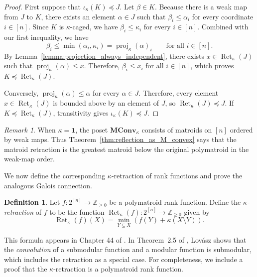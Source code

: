 \documentclass[11pt]{article}
\theoremstyle{definition}
\newtheorem{definition}[theorem]{Definition}
\theoremstyle{remark}
\newtheorem{remark}[theorem]{Remark}
\newcommand{\Zgeq}{\mathbb{Z}_{\geq 0}}       %
\newcommand{\ones}{\textbf{1}}
\newcommand{\MConvK}{\mathbf{MConv}_\kappa}
\DeclareMathOperator{\proj}{proj}              %
\newcommand{\kproj}{\proj_{\kappa}}            %
\DeclareMathOperator{\Ret}{Ret}                %
\newcommand{\RetK}{\Ret_{\kappa}}              %
\begin{document}
\begin{proof}
    First suppose that $\iota_\kappa(K)\preceq J$. Let $\beta\in K$.
    Because there is a weak map from $J$ to $K$, there exists an element
    $\alpha\in J$ such that $\beta_i\leq\alpha_i$ for every coordinate
    $i\in[n]$. Since $K$ is $\kappa$-caged, we have
    $\beta_i\leq\kappa_i$ for every $i\in[n]$. Combined with our first
    inequality, we have
    \[
        \beta_i
        \leq
        \min(\alpha_i,\kappa_i)
        =
        \kproj(\alpha)_i
        \qquad\text{for all }i\in[n].
    \]
    By Lemma~\ref{lemma:projection_always_independent}, there exists
    $x\in\RetK(J)$ such that $\kproj(\alpha)\leq x$. Therefore,
    $\beta_i\leq x_i$ for all $i\in[n]$, which proves
    $K\preceq\RetK(J)$.

    Conversely, $\kproj(\alpha)\leq\alpha$ for every $\alpha\in J$.
    Therefore, every element $x\in\RetK(J)$ is bounded above by an element
    of $J$, so $\RetK(J)\preceq J$. If
    $K\preceq\RetK(J)$, transitivity gives
    $\iota_\kappa(K)\preceq J$.
\end{proof}

\begin{remark}
    When $\kappa=\ones$, the poset $\MConvK$ consists of matroids on $[n]$
    ordered by weak maps. Thus Theorem~\ref{thm:reflection_as_M_convex}
    says that the matroid retraction is the greatest matroid below the
    original polymatroid in the weak-map order.
\end{remark}

We now define the corresponding $\kappa$-retraction of rank functions and
prove the analogous Galois connection.

\begin{definition}\label{def:rank_function_retraction}
    Let $f\colon 2^{[n]}\to\Zgeq$ be a polymatroid rank function. Define the
    \emph{$\kappa$-retraction} of $f$ to be the function
    $\RetK(f)\colon 2^{[n]}\to\Zgeq$ given by
    \[
        \RetK(f)(X)
        =
        \min_{Y\subseteq X}
        \left(f(Y)+\kappa(X\setminus Y)\right).
    \]
\end{definition}

This formula appears in Chapter 44 of
\cite{schrijver2003combinatorialB}. In Theorem~2.5 of \cite{Lovasz1983},
Lov\'asz shows that the \emph{convolution} of a submodular function and a
modular function is submodular, which includes the retraction as a special
case. For completeness, we include a proof that the $\kappa$-retraction is
a polymatroid rank function.
\end{document}
